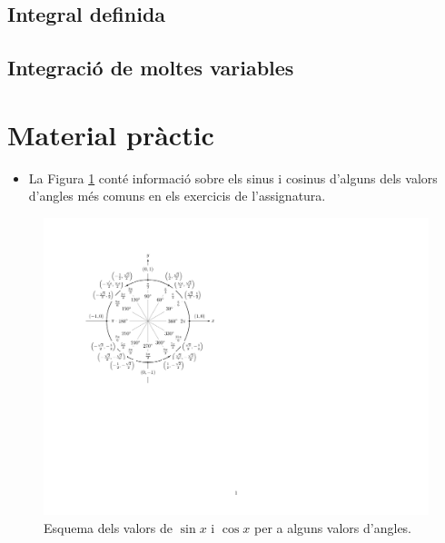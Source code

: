 \documentclass[12pt]{article}
\begin{document}
\begin{ExerciseList}
\subsection{Integral definida}




\subsection{Integració de moltes variables}




\end{ExerciseList}

\section{Material pràctic}

\begin{itemize}
    \item La Figura \ref{Fig:unitcircle} conté informació sobre els sinus i cosinus d'alguns dels valors d'angles més comuns en els exercicis de l'assignatura.
\end{itemize}

\begin{figure}
    \begin{minipage}[r]{0.7\textwidth}
      \includegraphics[width=\textwidth]{unitcircletikz}
    \end{minipage}\hfill
    \begin{minipage}[l]{0.3\textwidth}
      \caption{
        Esquema dels valors de $\sin x$ i $\cos x$ per a alguns valors d'angles.
      } \label{Fig:unitcircle}
    \end{minipage}
  \end{figure}
  
\end{document}
